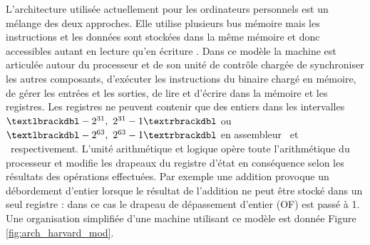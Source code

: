 L'architecture utilisée actuellement pour les ordinateurs personnels est un mélange des deux approches.
Elle utilise plusieurs bus mémoire mais les instructions et les données sont stockées dans la même mémoire et donc accessibles autant en lecture qu'en écriture \cite{timsit}.
Dans ce modèle la machine est articulée autour du processeur et de son unité de contrôle chargée de synchroniser les autres composants, d'exécuter les instructions du binaire chargé en mémoire, de gérer les entrées et les sorties, de lire et d'écrire dans la mémoire et les registres.
Les registres ne peuvent contenir que des entiers dans les intervalles $\textlbrackdbl -2^{31},\ 2^{31}-1\textrbrackdbl$ ou  $\textlbrackdbl -2^{63},\ 2^{63}-1\textrbrackdbl$ en assembleur \xq\ et \xs\ respectivement.
L'unité arithmétique et logique opère toute l'arithmétique du processeur et modifie les drapeaux du registre d'état en conséquence selon les résultats des opérations effectuées. 
Par exemple une addition provoque un débordement d'entier lorsque le résultat de l'addition ne peut être stocké dans un seul registre :  dans ce cas le drapeau de dépassement d'entier (OF) est passé à 1.
Une organisation simplifiée d'une machine utilisant ce modèle est donnée Figure \ref{fig:arch_harvard_mod}.

